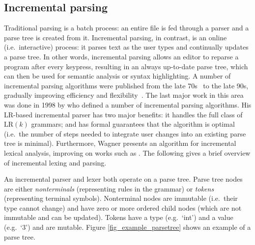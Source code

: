\documentclass[sigplan,screen]{acmart}\settopmatter{printfolios=true,printccs=false,printacmref=false}
\begin{document}
\subsection{Incremental parsing}

Traditional parsing is a batch process: an entire file is fed through a parser
and a parse tree is created from it. Incremental parsing, in contrast, is an
online (i.e.~interactive) process: it parses text as the user types and
continually updates a parse tree.  In other words, incremental parsing allows
an editor to reparse a program after every keypress, resulting in an always
up-to-date parse tree, which can then be used for semantic analysis or syntax
highlighting.  A number of incremental parsing algorithms were published from
the late 70s~\cite{ghezzi79incremental, jalili82building, larcheveque95optimal,
petrone95reusing} to the late 90s, gradually improving efficiency and
flexibility~\cite{li97new,ferro94efficient}.  The last major work in this area
was done in 1998 by \cite{wagner98practicalalgorithms} who defined a number of
incremental parsing algorithms. His LR-based incremental parser has two major
benefits: it handles the full class of $\textrm{LR}(k)$ grammars; and has
formal guarantees that the algorithm is optimal (i.e.~the number of steps
needed to integrate user changes into an existing parse tree is minimal).
Furthermore, Wagner presents an algorithm for incremental lexical analysis,
improving on works such as \cite{fischer84poe, bahlke86psg, ballance92pan,
fischer92aladin}. The following gives a brief overview of incremental lexing
and parsing.

An incremental parser and lexer both operate on a parse tree. Parse tree nodes
are either \emph{nonterminals} (representing rules in the grammar) or
\emph{tokens} (representing terminal symbols). Nonterminal nodes are immutable
(i.e.~their type cannot change) and have zero or more ordered child nodes
(which are not immutable and can be updated). Tokens have a type (e.g.~`int')
and a value (e.g.~`3') and are mutable. Figure \ref{fig_example_parsetree}
shows an example of a parse tree.
\end{document}
